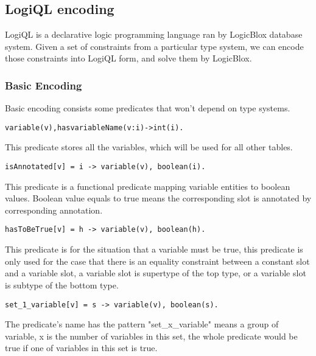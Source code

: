 \documentclass[11pt]{article}
\begin{document}
\subsection{LogiQL encoding}
\par LogiQL is a declarative logic programming language ran by LogicBlox database system. Given a set of constraints from a particular type system, we can encode those constraints into LogiQL form, and solve them by LogicBlox.
\subsubsection{Basic Encoding} 
Basic encoding consists some predicates that won't depend on type systems.
\begin{lstlisting}
variable(v),hasvariableName(v:i)->int(i).
\end{lstlisting}
\par This predicate stores all the variables, which will be used for all other tables. 

\begin{lstlisting}
isAnnotated[v] = i -> variable(v), boolean(i).
\end{lstlisting}
\par This predicate is a functional predicate mapping variable entities to boolean values. Boolean value equals to true means the corresponding slot is annotated by corresponding annotation. 

\begin{lstlisting}
hasToBeTrue[v] = h -> variable(v), boolean(h).
\end{lstlisting}
\par This predicate is for the situation that a variable must be true, this predicate is only used for the case that there is an equality constraint between a constant slot and a variable slot, a variable slot is supertype of the top type, or a variable slot is subtype of the bottom type.

\begin{lstlisting}
set_1_variable[v] = s -> variable(v), boolean(s).
\end{lstlisting}
\par The predicate's name has the pattern "set\_x\_variable" means a group of variable, x is the number of variables in this set, the whole predicate would be true if one of variables in this set is true.
\end{document}
